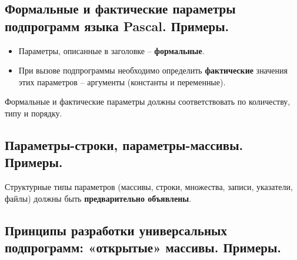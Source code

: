 



\newpage\subsection{Формальные и фактические параметры подпрограмм языка Pascal. Примеры. }

\begin{myquote}
\end{myquote}

\begin{itemize}
\item Параметры, описанные в заголовке – {\bf формальные}. 

\item При вызове подпрограммы необходимо определить {\bf фактические} значения этих параметров – аргументы (константы и переменные).
\end{itemize}

\noindent
Формальные и фактические параметры должны соответствовать по количеству, типу и порядку.



\newpage\subsection{Параметры-строки, параметры-массивы. Примеры. }

\begin{myquote}
\end{myquote}

Структурные типы параметров (массивы, строки, множества, записи, указатели, файлы) должны быть {\bf предварительно объявлены}.





\newpage\subsection{Принципы разработки универсальных подпрограмм: «открытые» массивы. Примеры. }

\begin{myquote}
            
\end{myquote}

